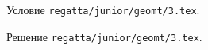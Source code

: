 \problem
Условие \texttt{regatta/junior/geomt/3.tex}.

\solution Решение \texttt{regatta/junior/geomt/3.tex}.
\endproblem
